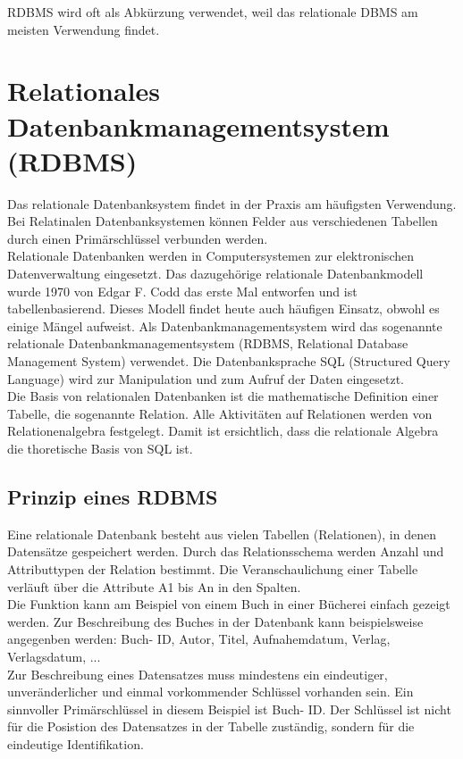 \documentclass[12pt,a4paper]{report}
\begin{document}
\begin{onehalfspace}
RDBMS wird oft als Abkürzung verwendet, weil das relationale DBMS am meisten Verwendung findet.

\section{Relationales Datenbankmanagementsystem (RDBMS)}
Das relationale Datenbanksystem findet in der Praxis am häufigsten Verwendung.
Bei Relatinalen Datenbanksystemen können Felder aus verschiedenen Tabellen durch einen Primärschlüssel verbunden werden.\\

Relationale Datenbanken werden in Computersystemen zur elektronischen Datenverwaltung eingesetzt. Das dazugehörige relationale Datenbankmodell wurde 1970 von Edgar F. Codd das erste Mal entworfen und ist tabellenbasierend. Dieses Modell findet heute auch häufigen Einsatz, obwohl es einige Mängel aufweist. Als Datenbankmanagementsystem wird das sogenannte relationale Datenbankmanagementsystem (RDBMS, Relational Database Management System) verwendet. Die Datenbanksprache SQL (Structured Query Language) wird zur Manipulation und zum Aufruf der Daten eingesetzt.\\

Die Basis von relationalen Datenbanken ist die mathematische Definition einer Tabelle, die sogenannte Relation. Alle Aktivitäten auf Relationen werden von Relationenalgebra festgelegt. Damit ist ersichtlich, dass die relationale Algebra die thoretische Basis von SQL ist.

\subsection{Prinzip eines RDBMS}
Eine relationale Datenbank besteht aus vielen Tabellen (Relationen), in denen Datensätze gespeichert werden. Durch das Relationsschema werden Anzahl und Attributtypen der Relation bestimmt. Die Veranschaulichung einer Tabelle verläuft über die Attribute A1 bis An in den Spalten.\\

Die Funktion kann am Beispiel von einem Buch in einer Bücherei einfach gezeigt werden. Zur Beschreibung des Buches in der Datenbank kann beispielsweise angegenben werden: Buch- ID, Autor, Titel, Aufnahemdatum, Verlag, Verlagsdatum, ...
\\Zur Beschreibung eines Datensatzes muss mindestens ein eindeutiger, unveränderlicher und einmal vorkommender Schlüssel vorhanden sein. Ein sinnvoller Primärschlüssel in diesem Beispiel ist Buch- ID. Der Schlüssel ist nicht für die Posistion des Datensatzes in der Tabelle zuständig, sondern für die eindeutige Identifikation.


\end{onehalfspace}
\end{document}
